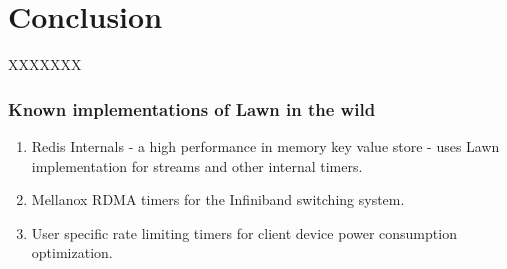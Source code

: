 \documentclass[twocolumn,a4paper]{article}
\begin{document}
\section{Conclusion}
XXXXXXX

\subsubsection{Known implementations of Lawn in the wild}
\begin{enumerate}
	\item Redis Internals \cite{Redis} - a high performance in memory key value store - uses Lawn implementation for streams and other internal timers.
	\item Mellanox RDMA timers for the Infiniband switching system\cite{MLNX}.
	\item User specific rate limiting timers for client device power consumption optimization\cite{VUSR}.
\end{enumerate}



\end{document}
